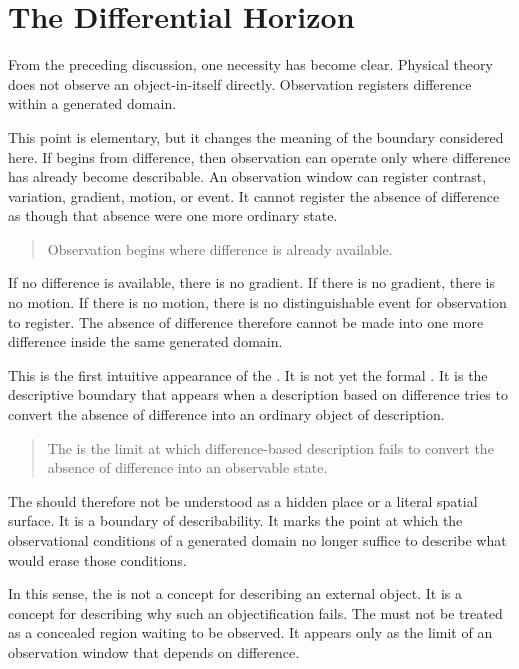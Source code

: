 \section{The Differential Horizon}

\label{sec:dh}

From the preceding discussion,
one necessity has become clear.
Physical theory does not observe an object-in-itself directly.
Observation registers difference within a generated domain.

This point is elementary,
but it changes the meaning of the boundary considered here.
If \VED{} begins from difference,
then observation can operate only where difference has already become
describable.
An observation window can register contrast,
variation,
gradient,
motion,
or event.
It cannot register the absence of difference as though that absence
were one more ordinary state.

\medskip
\begin{quote}
Observation begins where difference is already available.
\end{quote}
\medskip

If no difference is available,
there is no gradient.
If there is no gradient,
there is no motion.
If there is no motion,
there is no distinguishable event for observation to register.
The absence of difference therefore cannot be made into one more
difference inside the same generated domain.

This is the first intuitive appearance of the \DH{}.
It is not yet the formal \DHP{}.
It is the descriptive boundary that appears when a description based
on difference tries to convert the absence of difference into an
ordinary object of description.

\medskip
\begin{quote}
The \DH{} is the limit at which difference-based description
fails to convert the absence of difference into an observable state.
\end{quote}
\medskip

The \DH{} should therefore not be understood as a hidden place or a
literal spatial surface.
It is a boundary of describability.
It marks the point at which the observational conditions of a generated
domain no longer suffice to describe what would erase those conditions.

In this sense,
the \DH{} is not a concept for describing an external object.
It is a concept for describing why such an objectification fails.
The \ungenerated{} must not be treated as a concealed region waiting
to be observed.
It appears only as the limit of an observation window that depends on
difference.

